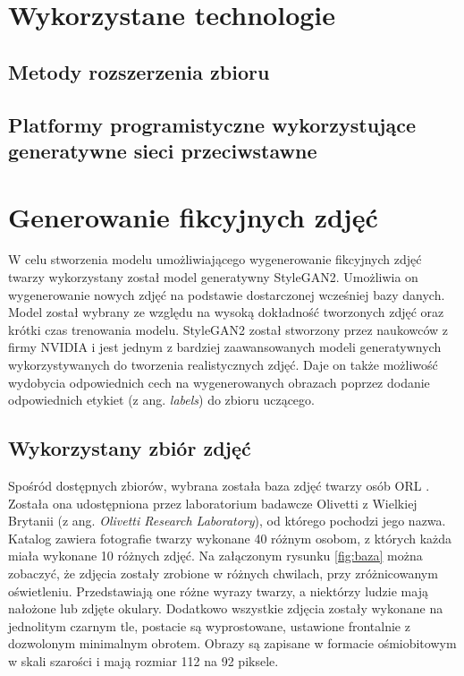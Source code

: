 \documentclass[eng,printmode]{mgr}
\begin{document}





\chapter{Wykorzystane technologie}

\section{Metody rozszerzenia zbioru}

\section{Platformy programistyczne wykorzystujące generatywne sieci przeciwstawne}





\chapter{Generowanie fikcyjnych zdjęć}

W celu stworzenia modelu umożliwiającego wygenerowanie fikcyjnych zdjęć twarzy wykorzystany został model generatywny StyleGAN2. Umożliwia on wygenerowanie nowych zdjęć na podstawie dostarczonej wcześniej bazy danych. Model został wybrany ze względu na wysoką dokładność tworzonych zdjęć oraz krótki czas trenowania modelu. StyleGAN2 został stworzony przez naukowców z firmy NVIDIA i jest jednym z bardziej zaawansowanych modeli generatywnych wykorzystywanych do tworzenia realistycznych zdjęć. Daje on także możliwość wydobycia odpowiednich cech na wygenerowanych obrazach poprzez dodanie odpowiednich etykiet (z ang. \textit{labels}) do zbioru uczącego.   

\section{Wykorzystany zbiór zdjęć}

Spośród dostępnych zbiorów, wybrana została baza zdjęć twarzy osób ORL \cite{ORL}. Została ona udostępniona przez laboratorium badawcze Olivetti z Wielkiej Brytanii (z ang. \textit{Olivetti Research Laboratory}), od którego pochodzi jego nazwa. Katalog zawiera fotografie twarzy wykonane 40 różnym osobom, z których każda miała wykonane 10 różnych zdjęć. Na załączonym rysunku \ref{fig:baza} można zobaczyć, że zdjęcia zostały zrobione w różnych chwilach, przy zróżnicowanym oświetleniu. Przedstawiają one różne wyrazy twarzy, a niektórzy ludzie mają nałożone lub zdjęte okulary. Dodatkowo wszystkie zdjęcia zostały wykonane na jednolitym czarnym tle, postacie są wyprostowane, ustawione frontalnie z dozwolonym minimalnym obrotem.  Obrazy są zapisane w formacie ośmiobitowym w skali szarości i mają rozmiar 112 na 92 piksele. 
\end{document}
